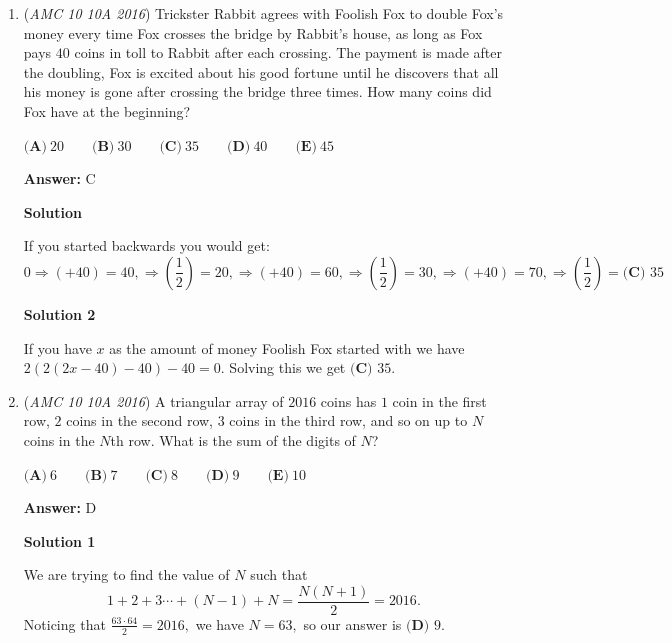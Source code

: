 \begin{enumerate}
 \textbf{Check} Order the list: $\{40,50,60,90,100,200\}$. $x$ must be either $60$ or $90$ because it is both the median and the mode of the set. Thus $90$ is correct.

 


 


 


	\item (\textit{AMC 10 10A 2016}) Trickster Rabbit agrees with Foolish Fox to double Fox's money every time Fox crosses the bridge by Rabbit's house, as long as Fox pays $40$ coins in toll to Rabbit after each crossing. The payment is made after the doubling, Fox is excited about his good fortune until he discovers that all his money is gone after crossing the bridge three times. How many coins did Fox have at the beginning?


 $\textbf{(A)}\ 20 \qquad\textbf{(B)}\ 30\qquad\textbf{(C)}\ 35\qquad\textbf{(D)}\ 40\qquad\textbf{(E)}\ 45$

 \textbf{Answer: }C



\textbf{Solution}

If you started backwards you would get: 
 \[0\Rightarrow (+40)=40 , \Rightarrow \left(\frac{1}{2}\right)=20 , \Rightarrow (+40)=60 , \Rightarrow \left(\frac{1}{2}\right)=30 , \Rightarrow (+40)=70 , \Rightarrow \left(\frac{1}{2}\right)=\boxed{\textbf{(C) }35}\]




\textbf{Solution 2}

If you have $x$ as the amount of money Foolish Fox started with we have $2(2(2x-40)-40)-40=0.$ Solving this we get $\boxed{\textbf{(C) }35}$.

 


	\item (\textit{AMC 10 10A 2016}) A triangular array of $2016$ coins has $1$ coin in the first row, $2$ coins in the second row, $3$ coins in the third row, and so on up to $N$ coins in the $N$th row. What is the sum of the digits of $N$?


 $\textbf{(A)}\ 6\qquad\textbf{(B)}\ 7\qquad\textbf{(C)}\ 8\qquad\textbf{(D)}\ 9\qquad\textbf{(E)}\ 10$

 \textbf{Answer: }D



\textbf{Solution 1}

We are trying to find the value of $N$ such that 
 \[1+2+3\cdots+(N-1)+N=\frac{N(N+1)}{2}=2016.\] Noticing that $\frac{63\cdot 64}{2}=2016,$ we have $N=63,$ so our answer is $\boxed{\textbf{(D) } 9}.$


\end{enumerate}
